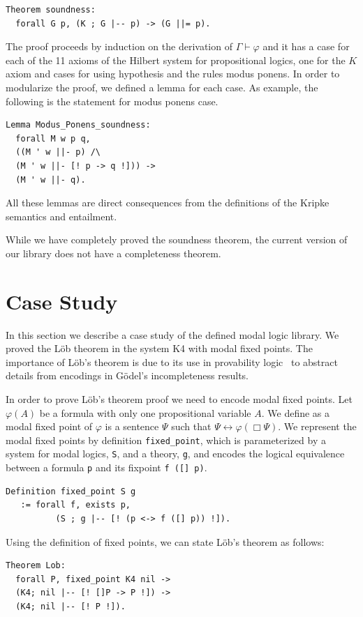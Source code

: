 \documentclass[sigconf]{acmart}
\begin{document}
\begin{verbatim}
Theorem soundness:
  forall G p, (K ; G |-- p) -> (G ||= p).
\end{verbatim}

The proof proceeds by induction on the derivation of $\Gamma \vdash\varphi$ and
it has a case for each of the 11 axioms of the Hilbert system for propositional
logics, one for the $K$ axiom and cases for using hypothesis and the rules modus
ponens. In order to modularize the proof, we defined a lemma for each case.
As example, the following is the statement for modus ponens case.
\begin{verbatim}
Lemma Modus_Ponens_soundness:
  forall M w p q,
  ((M ' w ||- p) /\
  (M ' w ||- [! p -> q !])) ->
  (M ' w ||- q).
\end{verbatim}
All these lemmas are direct consequences from the definitions of the Kripke
semantics and entailment.

While we have completely proved the soundness theorem, the current version of
our library does not have a completeness theorem. 


\section{Case Study}\label{sec:case}

In this section we describe a case study of the defined modal logic library.
We proved the L\"ob theorem in the system K4 with modal fixed points.
The importance of L\"ob's theorem is due to its use in provability
logic~\cite{boolos_1994} to abstract details from encodings in G\"odel's
incompleteness results.

In order to prove L\"ob's theorem proof we need to encode modal
fixed points. Let $\varphi(A)$ be a formula with only one propositional variable
$A$. We define as a modal fixed point of $\varphi$ is a sentence $\Psi$ such that
$\Psi \leftrightarrow \varphi(\Box \Psi)$.
We represent the modal fixed points by definition \texttt{fixed_point},
which is parameterized by a system for modal logics, \texttt{S}, and a
theory, \texttt{g}, and encodes the logical equivalence between a
formula \texttt{p} and its fixpoint \texttt{f ([] p)}. 
\begin{verbatim}
Definition fixed_point S g
   := forall f, exists p,
          (S ; g |-- [! (p <-> f ([] p)) !]).
\end{verbatim}

Using the definition of fixed points, we can state L\"ob's theorem as follows:
\begin{verbatim}
Theorem Lob:
  forall P, fixed_point K4 nil ->
  (K4; nil |-- [! []P -> P !]) ->
  (K4; nil |-- [! P !]).
\end{verbatim}
\end{document}
